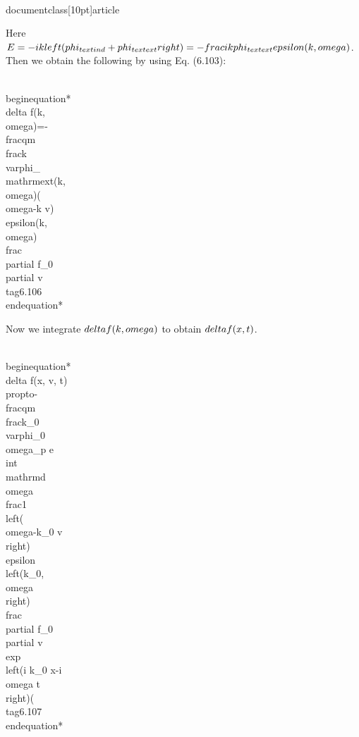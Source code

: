 \\documentclass[10pt]{article}
\begin{document}
{{{{Here $E=-i k\\left(\\phi_{\\text {ind }}+\\phi_{\\text {ext }}\\right)=-\\frac{i k \\phi_{\\text {ext }}}{\\epsilon(k, \\omega)}$. Then we obtain the following by using Eq. (6.103):


\\begin{equation*}
\\delta f(k, \\omega)=-\\frac{q}{m} \\frac{k \\varphi_{\\mathrm{ext}}(k, \\omega)}{(\\omega-k v) \\epsilon(k, \\omega)} \\frac{\\partial f_{0}}{\\partial v} \\tag{6.106}
\\end{equation*}


Now we integrate $\\delta f(k, \\omega)$ to obtain $\\delta f(x, t)$.


\\begin{equation*}
\\delta f(x, v, t) \\propto-\\frac{q}{m} \\frac{k_{0} \\varphi_{0}}{\\omega_{p e}} \\int \\mathrm{d} \\omega \\frac{1}{\\left(\\omega-k_{0} v\\right) \\epsilon\\left(k_{0}, \\omega\\right)} \\frac{\\partial f_{0}}{\\partial v} \\exp \\left(i k_{0} x-i \\omega t\\right)( \\tag{6.107}
\\end{equation*}


}}}}
\end{document}
